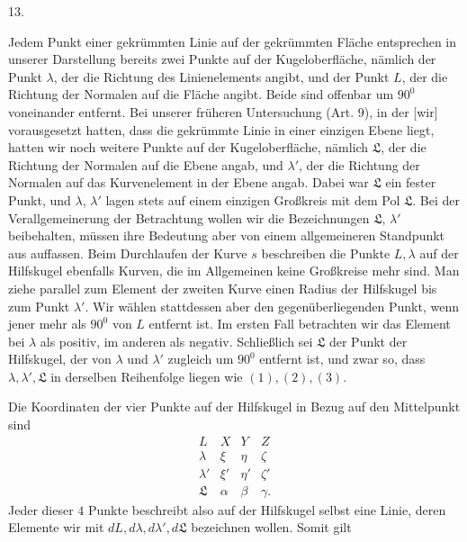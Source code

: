%
\begin{center}13.\end{center}
\noindent\hspace*{1.2em}Jedem Punkt einer gekrümmten Linie auf der gekrümmten Fläche entsprechen in unserer Darstellung bereits zwei Punkte auf der Kugeloberfläche, nämlich der Punkt $\lambda$, der die Richtung des Linienelements angibt, und der Punkt $L$, der die Richtung der Normalen auf die Fläche angibt. Beide sind offenbar um $90^{0}$ voneinander entfernt. Bei unserer früheren Untersuchung (Art. $9$), in der [wir] vorausgesetzt hatten, dass die gekrümmte Linie in einer einzigen Ebene liegt, hatten wir noch  weitere Punkte auf der Kugeloberfläche, nämlich $\mathfrak{L}$, der die Richtung der Normalen auf die Ebene angab, und $\lambda'$, der die Richtung der Normalen auf das Kurvenelement in der Ebene angab. Dabei war $\mathfrak{L}$ ein fester Punkt, und $\lambda$, $\lambda'$ lagen stets auf einem einzigen Großkreis mit dem Pol $\mathfrak{L}$. Bei der Verallgemeinerung der Betrachtung wollen wir die Bezeichnungen $\mathfrak{L}$, $\lambda'$ beibehalten, müssen ihre Bedeutung aber von einem allgemeineren Standpunkt aus auffassen. Beim Durchlaufen der Kurve $s$ beschreiben die Punkte $L,\lambda$ auf der Hilfskugel ebenfalls Kurven, die im Allgemeinen keine Großkreise mehr sind. Man ziehe parallel zum Element der zweiten Kurve einen Radius der Hilfskugel bis zum Punkt $\lambda'$. Wir wählen stattdessen aber den gegenüberliegenden Punkt, wenn jener mehr als $90^{0}$ von $L$ entfernt ist. Im ersten Fall betrachten wir das Element bei $\lambda$ als positiv, im anderen als negativ. Schließlich sei $\mathfrak{L}$ der Punkt der Hilfskugel, der von $\lambda$ und $\lambda'$ zugleich um $90^{0}$ entfernt ist, und zwar so, dass $\lambda,\lambda',\mathfrak{L}$ in derselben Reihenfolge liegen wie $(1),(2),(3)$.

Die Koordinaten der vier Punkte auf der Hilfskugel in Bezug auf den Mittelpunkt sind
\[
\begin{array}{cccc}
L&X&Y&Z\\
\lambda&\xi&\eta&\zeta\\
\lambda'&\xi'&\eta'&\zeta'\\
\mathfrak{L}&\alpha&\beta&\gamma.
\end{array}
\]
Jeder dieser $4$ Punkte beschreibt also auf der Hilfskugel selbst eine Linie, deren Elemente wir mit $dL,d\lambda,d\lambda',d\mathfrak{L}$ bezeichnen wollen. Somit gilt
